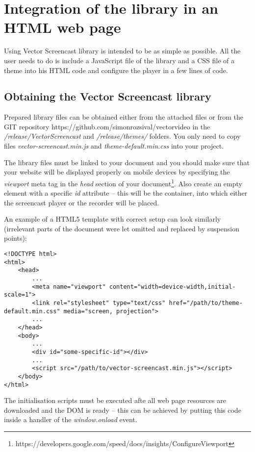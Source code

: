 \chapter{Integration of the library in an HTML web page}
\label{ch:integration}

Using Vector Screencast library is intended to be as simple as possible. All the user needs to do is include a JavaScript file of the library and a CSS file of a theme into his HTML code and configure the player in a few lines of code.

\section{Obtaining the Vector Screencast library}
Prepared library files can be obtained either from the attached files or from the GIT repository https://github.com/simonrozsival/vectorvideo in the \textit{/release/VectorScreencast} and \textit{/release/themes/} folders. You only need to copy files \textit{vector-screencast.min.js} and \textit{theme-default.min.css} into your project.

The library files must be linked to your document and you should make sure that your website will be displayed properly on mobile devices by specifying the \textit{viewport} meta tag in the \textit{head} section of your document\footnote{https://developers.google.com/speed/docs/insights/ConfigureViewport}. Also create an empty element with a specific \textit{id} attribute -- this will be the container, into which either the screencast player or the recorder will be placed.

An example of a HTML5 template with correct setup can look similarly (irrelevant parts of the document were let omitted and replaced by suspension points):

\begin{lstlisting}
<!DOCTYPE html>
<html>
	<head>
		...
		<meta name="viewport" content="width=device-width,initial-scale=1">
		<link rel="stylesheet" type="text/css" href="/path/to/theme-default.min.css" media="screen, projection">
		...
	</head>
	<body>
		...
		<div id="some-specific-id"></div>
		...
		<script src="/path/to/vector-screencast.min.js"></script>
	</body>
</html>
\end{lstlisting}

The initialisation scripts must be executed afte all web page resources are downloaded and the DOM is ready -- this can be achieved by putting this code inside a handler of the \textit{window.onload} event.

